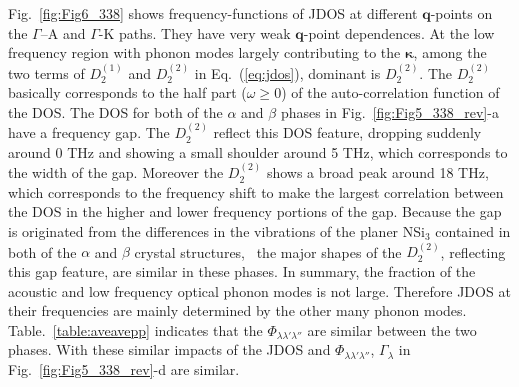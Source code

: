 \documentclass[twocolumn,amsmath,amssymb,a4paper,prb,superscriptaddress,floatfix]{revtex4-1}
\begin{document}
Fig.~\ref{fig:Fig6_338} shows frequency-functions of JDOS at different
$\mathbf{q}$-points on the $\Gamma$--A and $\Gamma$-K paths. They have very weak
$\mathbf{q}$-point dependences. At the low frequency region with phonon modes
largely contributing to the $\boldsymbol{\kappa}$, among the two terms of
$D_2^{(1)}$ and $D_2^{(2)}$ in Eq.~(\ref{eq:jdos}), dominant is $D_2^{(2)}$.
The $D_2^{(2)}$ basically corresponds to the half part ($\omega \geq  0$) of the
auto-correlation function of the DOS. The DOS for both of the $\alpha$ and
$\beta$ phases in Fig.~\ref{fig:Fig5_338_rev}-a have a frequency gap. The
$D_2^{(2)}$ reflect this DOS feature, dropping suddenly around 0 THz and showing
a small shoulder around 5 THz, which corresponds to the width of the gap.
Moreover the $D_2^{(2)}$ shows a broad peak around 18 THz, which corresponds to
the frequency shift to make the largest correlation between the DOS in the
higher and lower frequency portions of the gap.  Because the gap is  originated
from the differences in the vibrations of the planer NSi$_3$ contained in both
of the $\alpha$ and $\beta$ crystal structures,~\cite{kuwabara} the major shapes
of the $D_2^{(2)}$, reflecting this gap feature, are similar in these phases.
In summary, the fraction of the acoustic and low frequency optical phonon modes
is not large. Therefore JDOS at their frequencies are mainly determined by the
other many phonon modes.  Table.~\ref{table:aveavepp} indicates that the
$\Phi_{\lambda\lambda'\lambda''}$ are similar between the two phases.  With
these similar impacts of the JDOS and $\Phi_{\lambda\lambda'\lambda''}$,
$\Gamma_\lambda$ in Fig.~\ref{fig:Fig5_338_rev}-d are similar.  
\end{document}
